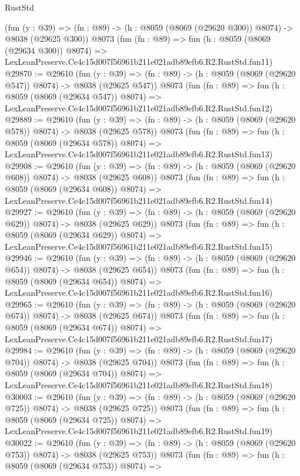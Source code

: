 \begin{lexlean}{RustStd}
\begin{coremodule}
    (fun (y : @39) => (fn : @89) -> (h : @8059 (@8069 (@29620 @300)) @8074) -> @8038 (@29625 @300))
    @8073
    (fun (fn : @89) =>
    fun (h : @8059 (@8069 (@29634 @300)) @8074) =>
    LexLeanPreserve.Ce4c15d007f56961b211e021adb89efb6.R2.RustStd.fun11)
@29870 := @29610
    (fun (y : @39) => (fn : @89) -> (h : @8059 (@8069 (@29620 @547)) @8074) -> @8038 (@29625 @547))
    @8073
    (fun (fn : @89) =>
    fun (h : @8059 (@8069 (@29634 @547)) @8074) =>
    LexLeanPreserve.Ce4c15d007f56961b211e021adb89efb6.R2.RustStd.fun12)
@29889 := @29610
    (fun (y : @39) => (fn : @89) -> (h : @8059 (@8069 (@29620 @578)) @8074) -> @8038 (@29625 @578))
    @8073
    (fun (fn : @89) =>
    fun (h : @8059 (@8069 (@29634 @578)) @8074) =>
    LexLeanPreserve.Ce4c15d007f56961b211e021adb89efb6.R2.RustStd.fun13)
@29908 := @29610
    (fun (y : @39) => (fn : @89) -> (h : @8059 (@8069 (@29620 @608)) @8074) -> @8038 (@29625 @608))
    @8073
    (fun (fn : @89) =>
    fun (h : @8059 (@8069 (@29634 @608)) @8074) =>
    LexLeanPreserve.Ce4c15d007f56961b211e021adb89efb6.R2.RustStd.fun14)
@29927 := @29610
    (fun (y : @39) => (fn : @89) -> (h : @8059 (@8069 (@29620 @629)) @8074) -> @8038 (@29625 @629))
    @8073
    (fun (fn : @89) =>
    fun (h : @8059 (@8069 (@29634 @629)) @8074) =>
    LexLeanPreserve.Ce4c15d007f56961b211e021adb89efb6.R2.RustStd.fun15)
@29946 := @29610
    (fun (y : @39) => (fn : @89) -> (h : @8059 (@8069 (@29620 @654)) @8074) -> @8038 (@29625 @654))
    @8073
    (fun (fn : @89) =>
    fun (h : @8059 (@8069 (@29634 @654)) @8074) =>
    LexLeanPreserve.Ce4c15d007f56961b211e021adb89efb6.R2.RustStd.fun16)
@29965 := @29610
    (fun (y : @39) => (fn : @89) -> (h : @8059 (@8069 (@29620 @674)) @8074) -> @8038 (@29625 @674))
    @8073
    (fun (fn : @89) =>
    fun (h : @8059 (@8069 (@29634 @674)) @8074) =>
    LexLeanPreserve.Ce4c15d007f56961b211e021adb89efb6.R2.RustStd.fun17)
@29984 := @29610
    (fun (y : @39) => (fn : @89) -> (h : @8059 (@8069 (@29620 @704)) @8074) -> @8038 (@29625 @704))
    @8073
    (fun (fn : @89) =>
    fun (h : @8059 (@8069 (@29634 @704)) @8074) =>
    LexLeanPreserve.Ce4c15d007f56961b211e021adb89efb6.R2.RustStd.fun18)
@30003 := @29610
    (fun (y : @39) => (fn : @89) -> (h : @8059 (@8069 (@29620 @725)) @8074) -> @8038 (@29625 @725))
    @8073
    (fun (fn : @89) =>
    fun (h : @8059 (@8069 (@29634 @725)) @8074) =>
    LexLeanPreserve.Ce4c15d007f56961b211e021adb89efb6.R2.RustStd.fun19)
@30022 := @29610
    (fun (y : @39) => (fn : @89) -> (h : @8059 (@8069 (@29620 @753)) @8074) -> @8038 (@29625 @753))
    @8073
    (fun (fn : @89) =>
    fun (h : @8059 (@8069 (@29634 @753)) @8074) =>

\end{coremodule}
\end{lexlean}
